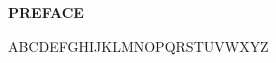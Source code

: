 
\begin{center}
{\Large \textbf{PREFACE}}
\end{center}

ABCDEFGHIJKLMNOPQRSTUVWXYZ
\tbw

\clearpage
